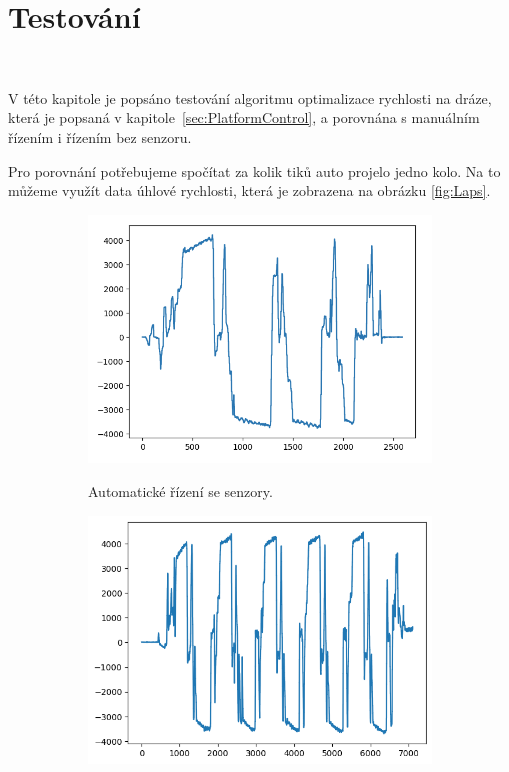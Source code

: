\chapter{Testování}
\label{sec:Testing}
\

V této kapitole je popsáno testování algoritmu optimalizace rychlosti na dráze,
která je popsaná v kapitole~\ref{sec:PlatformControl}, a porovnána s manuálním
řízením i řízením bez senzoru.

Pro porovnání potřebujeme spočítat za kolik tiků auto projelo jedno kolo. Na to můžeme využít data
úhlové rychlosti, která je zobrazena na obrázku \ref{fig:Laps}.

\begin{figure}[!h]
    \begin{subfigure}{.5\textwidth}
        \includegraphics[width = \textwidth]{Figures/LapAuto.png}
        \label{fig:LapsAuto}
        \caption{Automatické řízení se senzory.}
    \end{subfigure}
    \begin{subfigure}{.5\textwidth}
        \includegraphics[width = \textwidth]{Figures/LapAutoNoSensors.png}

\end{subfigure}
\end{figure}

